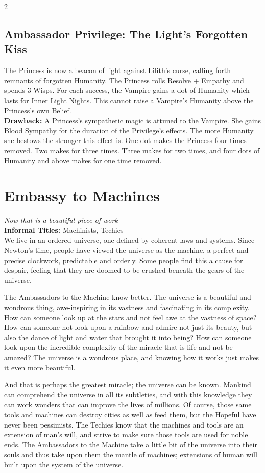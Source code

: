 \begin{multicols}{2}
\subsection*{Ambassador Privilege: The Light’s Forgotten Kiss}
The Princess is now a beacon of light against Lilith’s curse, calling forth remnants of forgotten Humanity. The Princess rolls Resolve + Empathy and spends 3 Wisps. For each success, the Vampire gains a dot of Humanity which lasts for Inner Light Nights. This cannot raise a Vampire's Humanity above the Princess's own Belief.\\

\textbf{Drawback:} A Princess’s sympathetic magic is attuned to the Vampire. She gains Blood Sympathy for the duration of the Privilege's effects. The more Humanity she bestows the stronger this effect is. One dot makes the Princess four times removed. Two makes for three times. Three makes for two times, and four dots of Humanity and above makes for one time removed.

\section*{Embassy to Machines}
\label{sec:EmbassyMachines}

\textit{Now that is a beautiful piece of work} \\

\noindent \textbf{Informal Titles:} Machinists, Techies \\

\noindent We live in an ordered universe, one defined by coherent laws and systems. Since Newton’s time, people have viewed the universe as the machine, a perfect and precise clockwork, predictable and orderly. Some people find this a cause for despair, feeling that they are doomed to be crushed beneath the gears of the universe.

The Ambassadors to the Machine know better. The universe is a beautiful and wondrous thing, awe-inspiring in its vastness and fascinating in its complexity. How can someone look up at the stars and not feel awe at the vastness of space? How can someone not look upon a rainbow and admire not just its beauty, but also the dance of light and water that brought it into being? How can someone look upon the incredible complexity of the miracle that is life and not be amazed? The universe is a wondrous place, and knowing how it works just makes it even more beautiful.

And that is perhaps the greatest miracle; the universe can be known. Mankind can comprehend the universe in all its subtleties, and with this knowledge they can work wonders that can improve the lives of millions. Of course, those same tools and machines can destroy cities as well as feed them, but the Hopeful have never been pessimists. The Techies know that the machines and tools are an extension of man’s will, and strive to make sure those tools are used for noble ends. The Ambassadors to the Machine take a little bit of the universe into their souls and thus take upon them the mantle of machines; extensions of human will built upon the system of the universe. 


\end{multicols}
